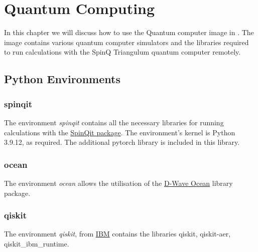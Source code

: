 \section{Quantum Computing}
In this chapter we will discuss how to use the  Quantum computer image in \uninuvola. The image contains various quantum computer simulators and the libraries required to run calculations with the SpinQ Triangulum quantum computer remotely. \\ 

\subsection{Python Environments}

\subsubsection{spinqit}
The environment \textit{spinqit} contains all the necessary libraries for running calculations with the \href{https://github.com/SpinQTech/SpinQit}{SpinQit package}. The environment's kernel is Python 3.9.12, as required. The additional pytorch library is included in this library. \\

\subsubsection{ocean}
The environment \textit{ocean} allows the utilisation of the  \href{https://docs.ocean.dwavesys.com/en/stable/}{D-Wave Ocean} library package. 

\subsubsection{qiskit}
The environment \textit{qiskit}, from \href{https://www.ibm.com/quantum/qiskit}{IBM} contains the libraries qiskit, qiskit-aer, qiskit\_ibm\_runtime. 



